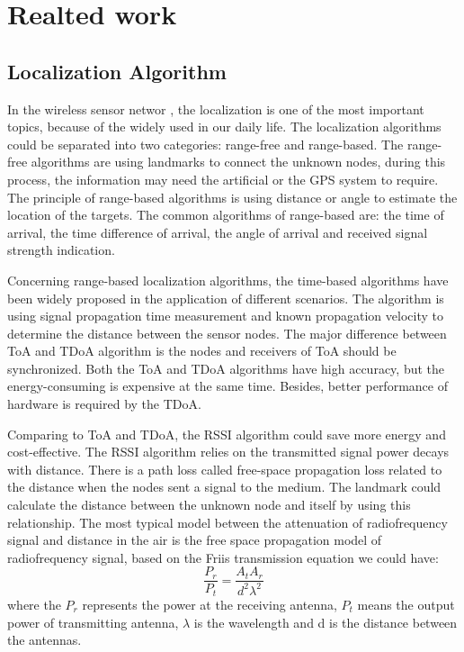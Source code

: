 
\section{Realted work}
\subsection{Localization Algorithm}
In the wireless sensor networ \cite{han2013localization}, the localization is one of the most important topics, because of the widely used in our daily life. The localization algorithms could be separated into two categories: range-free and range-based. The range-free algorithms are using landmarks to connect the unknown nodes, during this process, the information may need the artificial or the GPS system to require. The principle of range-based algorithms is using distance or angle to estimate the location of the targets. The common algorithms of range-based are: the time of arrival, the time difference of arrival, the angle of arrival and received signal strength indication. 

Concerning range-based localization algorithms\cite{kaune2012accuracy}, the time-based algorithms have been widely proposed in the application of different scenarios. The algorithm is using signal propagation time measurement and known propagation velocity to determine the distance between the sensor nodes. The major difference between ToA and TDoA algorithm is the nodes and receivers of ToA should be synchronized. Both the ToA and TDoA algorithms have high accuracy, but the energy-consuming is expensive at the same time. Besides, better performance of hardware is required by the TDoA. 

Comparing to ToA and TDoA, the RSSI\cite{laaraiedh2011comparison} \cite{mistry2015rssi} algorithm could save more energy and cost-effective. The RSSI algorithm relies on the transmitted signal power decays with distance. There is a path loss called free-space propagation loss related to the distance when the nodes sent a signal to the medium. The landmark could calculate the distance between the unknown node and itself by using this relationship. The most typical model between the attenuation of radiofrequency signal and distance in the air is the free space propagation model of radiofrequency signal, based on the Friis transmission equation we could have:\\
\begin{equation}
    \frac{P_{r}}{P_{t}} = \frac{A_{t} A_{r}}{d^{2} \lambda^{2}}
\end{equation}
where the $P_{r}$ represents the power at the receiving antenna, $P_{t}$ means the output power of transmitting antenna, $\lambda$ is the wavelength and d is the distance between the antennas.

